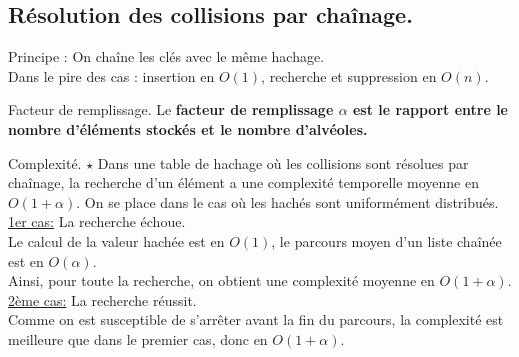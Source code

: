 \documentclass[french, 11pt]{article}
\begin{document}
\subsection{Résolution des collisions par chaînage.}

\begin{defi}{}{}
    Principe : On chaîne les clés avec le même hachage.\\
    Dans le pire des cas : insertion en $O(1)$, recherche et suppression en $O(n)$.
\end{defi}

\begin{defi}{Facteur de remplissage.}{}
    Le \bf{facteur de remplissage} $\alpha$ est le rapport entre le nombre d'éléments stockés et le nombre d'alvéoles.
\end{defi}

\begin{thm}{Complexité. $\star$}{}
    Dans une table de hachage où les collisions sont résolues par chaînage, la recherche d'un élément a une complexité temporelle moyenne en $O(1+\alpha)$.
    \tcblower
    On se place dans le cas où les hachés sont uniformément distribués.\\
    \underline{1er cas:} La recherche échoue.\\
    Le calcul de la valeur hachée est en $O(1)$, le parcours moyen d'un liste chaînée est en $O(\alpha)$.\\
    Ainsi, pour toute la recherche, on obtient une complexité moyenne en $O(1+\alpha)$.\n
    \underline{2ème cas:} La recherche réussit.\\
    Comme on est susceptible de s'arrêter avant la fin du parcours, la complexité est meilleure que dans le premier cas, donc en $O(1+\alpha)$.
\end{thm}
\end{document}
